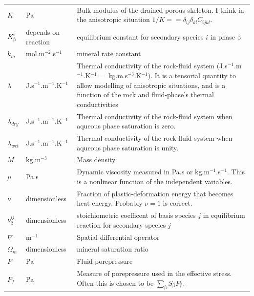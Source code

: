 \documentclass[12pt]{report}
\def\phase{\mathrm{\beta}}
\begin{document}
\begin{longtable}{llp{10cm}}
$K$ & Pa & Bulk modulus of the drained porous skeleton.  I think in
the anisotropic situation $1/K = = \delta_{ij}\delta_{kl}C_{ijkl}$. \\

$K_{\phase}^{i}$ & depends on reaction & equilibrium constant for secondary species $i$ in
phase $\phase$ \\

$k_{m}$ & mol.m$^{-2}$.s$^{-1}$ & mineral rate constant \\

$\lambda$ & J.s$^{-1}$.m$^{-1}$.K$^{-1}$ & Thermal conductivity of
the rock-fluid system (J.s$^{-1}$.m$^{-1}$.K$^{-1} =$
kg.m.s$^{-3}$.K$^{-1}$).  It is a tensorial quantity to allow
modelling of anisotropic situations, and is a function of the
rock and fluid-phase's thermal conductivities\\

$\lambda_{dry}$ & J.s$^{-1}$.m$^{-1}$.K$^{-1}$ & Thermal conductivity of
the rock-fluid system when aqueous phase saturation is zero. \\

$\lambda_{wet}$ & J.s$^{-1}$.m$^{-1}$.K$^{-1}$ & Thermal conductivity of
the rock-fluid system when aqueous phase saturation is unity. \\

$M$ & kg.m$^{-3}$ & Mass density \\

$\mu$ & Pa.s & Dynamic viscosity measured in Pa.s or
kg.m$^{-1}$.s$^{-1}$.  This is a nonlinear function of the independent
variables. \\

$\nu$ & dimensionless & Fraction of plastic-deformation energy that
becomes heat energy.  Probably $\nu=1$ is correct. \\

$\nu^{ij}_{\phase}$ & dimensionless & stoichiometric coefficent of
basis species $j$ in equilibrium reaction for secondary species $j$ \\

$\nabla$ & m$^{-1}$ & Spatial differential operator \\

$\Omega_{m}$ & dimensionless & mineral saturation ratio \\


$P$ & Pa & Fluid porepressure \\

$P_{f}$ & Pa & Measure of porepressure used in the effective stress.
Often this is chosen to be $\sum_{\phase}S_{\phase}P_{\phase}$. \\


\end{longtable}
\end{document}
